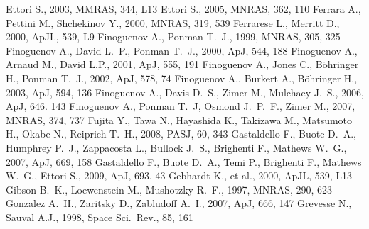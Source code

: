 \documentclass[useAMS,usenatbib]{mn2e}
\begin{document}
\begin{thebibliography}{}
   Ettori S., 2003, MMRAS, 344, L13
   Ettori S., 2005, MNRAS, 362, 110 
   Ferrara A., Pettini M., Shchekinov Y., 2000, MNRAS, 319, 539 
   Ferrarese L., Merritt D., 2000, ApJL, 539, L9 
   Finoguenov A., Ponman T.~J., 1999, MNRAS, 305, 325  
   Finoguenov A., David L.~P., Ponman T.~J., 2000, ApJ, 544, 188  
   Finoguenov A., Arnaud M., David L.P., 2001, ApJ, 555, 191  
   Finoguenov A., Jones C., B{\"o}hringer H., Ponman T.~J., 2002, ApJ, 578, 74
   Finoguenov A., Burkert A., B\"{o}hringer H., 2003, ApJ, 594, 136
   Finoguenov A., Davis D.~S., Zimer M., Mulchaey J.~S., 2006, ApJ, 646. 143
   Finoguenov A., Ponman T.~J, Osmond J.~P.~F., Zimer M., 2007, MNRAS, 374, 737
   Fujita Y., Tawa N., Hayashida K., Takizawa M., Matsumoto H., Okabe N., 
   Reiprich T.~H., 2008, PASJ, 60, 343 
   Gastaldello F., Buote D.~A., Humphrey P.~J., Zappacosta L., Bullock J.~S., 
   Brighenti F., Mathews W.~G., 2007, ApJ, 669, 158 
   Gastaldello F., Buote D.~A., Temi P., Brighenti F., Mathews W.~G., 
   Ettori S., 2009, ApJ, 693, 43 
   Gebhardt K., et al., 2000, ApJL, 539, L13 
    Gibson B.~K., Loewenstein M., Mushotzky R.~F., 1997, MNRAS, 290, 623 
   Gonzalez A.~H., Zaritsky D., Zabludoff A.~I., 2007, ApJ, 666, 147
   Grevesse N., Sauval A.J., 1998, Space Sci.\ Rev., 85, 161 

\end{thebibliography}
\end{document}
